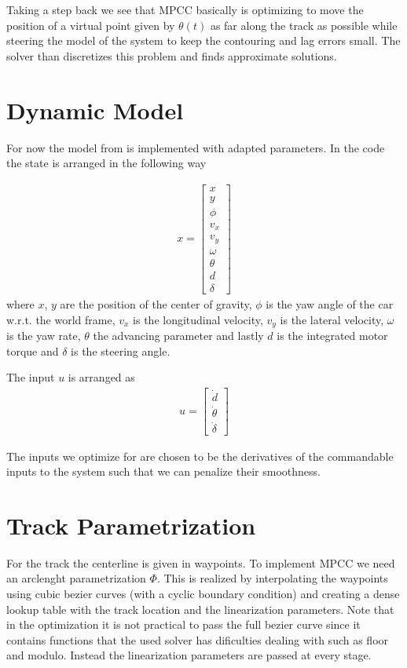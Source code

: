\documentclass[12pt]{article}
\begin{document}
Taking a step back we see that MPCC basically is optimizing to move the position of a virtual point given by $\theta(t)$ as far along the track as possible while steering the model of the system to keep the contouring and lag errors small. The solver than discretizes this problem and finds approximate solutions.
\section{Dynamic Model}

For now the model from \cite{liniger2015optimization} is implemented with adapted parameters. In the code the state is arranged in the following way

\begin{align}
x = \begin{bmatrix}
x\\
y\\
\phi\\
v_x\\
v_y\\
\omega\\
\theta\\
d\\
\delta
\end{bmatrix}
\end{align}
where $x$, $y$ are the position of the center of gravity, $\phi$ is the yaw angle of the car w.r.t. the world frame, $v_x$ is the longitudinal velocity, $v_y$ is the lateral velocity, $\omega$ is the yaw rate, $\theta$ the advancing parameter and lastly $d$ is the integrated motor torque and $\delta$ is the steering angle.

The input $u$ is arranged as
\begin{align}
u = \begin{bmatrix}
\dot{d}\\
\dot\theta\\
\dot\delta
\end{bmatrix}
\end{align} 

The inputs we optimize for are chosen to be the derivatives of the commandable inputs to the system such that we can penalize their smoothness.

\section{Track Parametrization}

For the track the centerline is given in waypoints. To implement MPCC we need an arclenght parametrization $\Phi$. This is realized by interpolating the waypoints using cubic bezier curves (with a cyclic boundary condition) and creating a dense lookup table with the track location and the linearization parameters. Note that in the optimization it is not practical to pass the  full bezier curve since it contains functions that the used solver has dificulties dealing with such as floor and modulo. Instead the linearization parameters are passed at every stage.   




\end{document}

